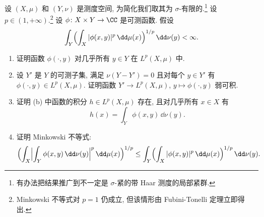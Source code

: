 \begin{exercise}
\label{ex:I.5.6.7}
设 $(X, \mu)$ 和 $(Y, \nu)$ 是测度空间, 为简化我们取其为 $\sigma$-有限的.\footnote{有办法把结果推广到不一定是 $\sigma$-紧的带 Haar 测度的局部紧群.} 设 $p \in (1, +\infty)$.\footnote{Minkowski 不等式对 $p = 1$ 仍成立, 但该情形由 Fubini-Tonelli 定理立即得出.} 设 $\phi \colon X \times Y \to \CC$ 是可测函数. 假设
\[
\int_Y\Bigl(\int_X|\phi(x, y)|^p\,\dd\mu(x)\Bigr)^{1/p}\,\dd\nu(y) < \infty.
\]
\begin{enumerate}
\item[(a)] 证明函数 $\phi(\cdot, y)$ 对几乎所有 $y \in Y$ 在 $L^p(X, \mu)$ 中.
\item[(b)] 设 $Y'$ 是 $Y$ 的可测子集, 满足 $\nu(Y - Y') = 0$ 且对每个 $y \in Y'$ 有 $\phi(\cdot, y) \in L^p(X, \mu)$. 证明函数 $Y' \to L^p(X, \mu)$, $y \longmapsto \phi(\cdot, y)$ 弱可积.
\item[(c)] 证明 (b) 中函数的积分 $h \in L^p(X, \mu)$ 存在, 且对几乎所有 $x \in X$ 有
\[
h(x) = \int_Y \phi(x, y)\,\dd\nu(y).
\]
\item[(d)] 证明 Minkowski 不等式:
\[
\Bigl(\int_X\Bigl|\int_Y\phi(x, y)\,\dd\nu(y)\Bigr|^p\,\dd\mu(x)\Bigr)^{1/p} \leq \int_Y\Bigl(\int_X|\phi(x, y)|^p\,\dd\mu(x)\Bigr)^{1/p}\,\dd\nu(y).
\]
\end{enumerate}
\end{exercise}

